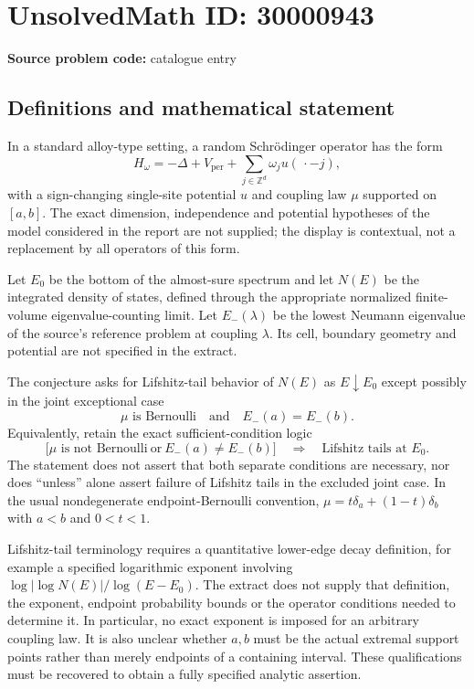 \documentclass[11pt]{article}
\newcommand{\Z}{\mathbb{Z}}
\begin{document}
\section*{UnsolvedMath ID: 30000943}
\textbf{Source problem code:} catalogue entry
\subsection{Definitions and mathematical statement}
In a standard alloy-type setting, a random Schrödinger operator has the form
\[
H_\omega=-\Delta+V_{\mathrm{per}}+\sum_{j\in\Z^d}\omega_j u(\,\cdot-j),
\]
with a sign-changing single-site potential $u$ and coupling law $\mu$ supported on $[a,b]$. The exact dimension, independence and potential hypotheses of the model considered in the report are not supplied; the display is contextual, not a replacement by all operators of this form.

Let $E_0$ be the bottom of the almost-sure spectrum and let $N(E)$ be the integrated density of states, defined through the appropriate normalized finite-volume eigenvalue-counting limit. Let $E_-(\lambda)$ be the lowest Neumann eigenvalue of the source's reference problem at coupling $\lambda$. Its cell, boundary geometry and potential are not specified in the extract.

The conjecture asks for Lifshitz-tail behavior of $N(E)$ as $E\downarrow E_0$ except possibly in the joint exceptional case
\[
\mu\text{ is Bernoulli}\quad\text{and}\quad E_-(a)=E_-(b).
\]
Equivalently, retain the exact sufficient-condition logic
\[
\bigl[\mu\text{ is not Bernoulli}\ \text{or}\ E_-(a)\ne E_-(b)\bigr]
\quad\Longrightarrow\quad
\text{Lifshitz tails at }E_0.
\]
The statement does not assert that both separate conditions are necessary, nor does ``unless'' alone assert failure of Lifshitz tails in the excluded joint case. In the usual nondegenerate endpoint-Bernoulli convention, $\mu=t\delta_a+(1-t)\delta_b$ with $a<b$ and $0<t<1$.

Lifshitz-tail terminology requires a quantitative lower-edge decay definition, for example a specified logarithmic exponent involving $\log|\log N(E)|/\log(E-E_0)$. The extract does not supply that definition, the exponent, endpoint probability bounds or the operator conditions needed to determine it. In particular, no exact exponent is imposed for an arbitrary coupling law. It is also unclear whether $a,b$ must be the actual extremal support points rather than merely endpoints of a containing interval. These qualifications must be recovered to obtain a fully specified analytic assertion.
\end{document}

